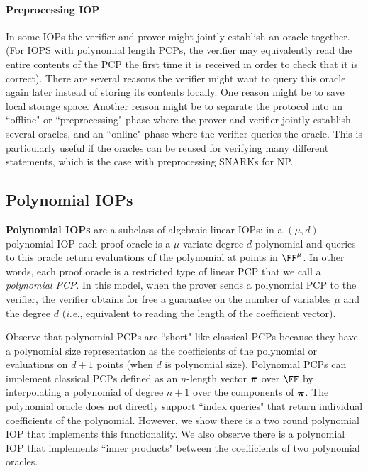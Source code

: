 \paragraph{Preprocessing IOP} In some IOPs the verifier and prover might jointly establish an oracle together. (For IOPS with polynomial length PCPs, the verifier may equivalently read the entire contents of the PCP the first time it is received in order to check that it is correct). There are several reasons the verifier might want to query this oracle again later instead of storing its contents locally. One reason might be to save local storage space. Another reason might be to separate the protocol into an ``offline" or ``preprocessing" phase where the prover and verifier jointly establish several oracles, and an ``online" phase where the verifier queries the oracle. This is particularly useful if the oracles can be reused for verifying many different statements, which is the case with preprocessing SNARKs for NP.  %

\subsection{Polynomial IOPs} 
\textbf{Polynomial IOPs} are a subclass of algebraic linear IOPs: in a $(\mu, d)$ polynomial IOP each proof oracle is a $\mu$-variate degree-$d$ polynomial and queries to this oracle return evaluations of the polynomial at points in $\FF^\mu$. In other words, each proof oracle is a restricted type of linear PCP that we call a \emph{polynomial PCP}. In this model, when the prover sends a polynomial PCP to the verifier, the verifier obtains for free a guarantee on the number of variables $\mu$ and the degree $d$ (\emph{i.e.}, equivalent to reading the length of the coefficient vector). 

Observe that polynomial PCPs are ``short" like classical PCPs because they have a polynomial size representation as the coefficients of the polynomial or evaluations on $d+1$ points (when $d$ is polynomial size). Polynomial PCPs can implement classical PCPs defined as an $n$-length vector $\boldsymbol{\pi}$ over $\FF$ by interpolating a polynomial of degree $n+1$ over the components of $\boldsymbol{\pi}$. The polynomial oracle does not directly support ``index queries" that return individual coefficients of the polynomial. However, we show there is a two round polynomial IOP that implements this functionality. We also observe there is a polynomial IOP that implements ``inner products" between the coefficients of two polynomial oracles. 

